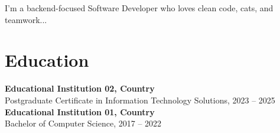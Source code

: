 \documentclass[11pt]{article}
\begin{document}

\vspace{1em}

I'm a backend-focused Software Developer who loves clean code, cats, and teamwork...

\vspace{1em}



\vspace{0.5em}




\vspace{1em}

\section*{Education}

\textbf{Educational Institution 02, Country} \\
Postgraduate Certificate in Information Technology Solutions, 2023 – 2025 \\

\textbf{Educational Institution 01, Country} \\
Bachelor of Computer Science, 2017 – 2022
\end{document}
